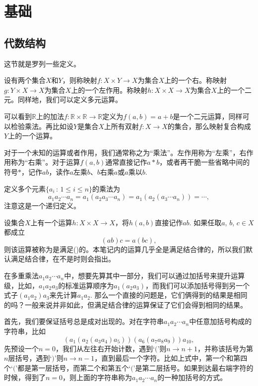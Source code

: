 \chapter{基础}

\section{代数结构}

这节就是罗列一些定义。

\begin{para}
设有两个集合$X$和$Y$，则称映射$f:X\times Y \to X$为集合$X$上的一个右。称映射$g:Y\times X \to X$为集合$X$上的一个左作用。称映射$h:X\times X \to X$为集合$X$上的一个二元。同样地，我们可以定义多元运算。
\end{para}

可以看到$\mathbb{R}$上的加法$f:\mathbb{R}\times \mathbb{R} \to \mathbb{R}$定义为$f(a,b)=a+b$是一个二元运算，同样可以检验乘法。再比如设$Y$是集合$X$上所有双射$f:X\to X$的集合，那么映射复合构成$Y$上的一个运算。

对于一个未知的运算或者作用，我们通常称之为“乘法”。左作用称为“左乘”，右作用称为“右乘”。对于运算$f(a,b)$通常直接记作$a*b$，或者再干脆一些省略中间的符号$*$，记作$ab$，读作$a$左乘$b$、$b$右乘$a$或$a$乘以$b$.

定义多个元素$\{a_i\,:\, 1\leq i \leq n\}$的乘法为
\[
	a_1a_2\cdots a_n=a_1(a_2a_3\cdots a_n)=a_1(a_2(a_3\cdots a_n))=\cdots,
\]
注意这是一个递归定义。

\begin{para}[结合律]
设集合$X$上有一个运算$h:X\times X \to X$，将$h(a,b)$直接记作$ab$. 如果任取$a$, $b$, $c\in X$都成立
\[
	(ab)c=a(bc),
\]
则该运算被称为是满足()的。本笔记内的运算几乎全是满足结合律的，所以我们默认满足结合律，在不是时则会指出。
\end{para}

在多重乘法$a_1a_2\cdots a_n$中，想要先算其中一部分，我们可以通过加括号来提升运算级，比如，$a_1a_2a_3$的标准运算顺序为$a_1(a_2a_3)$，而我们可以添加括号得到另一个式子$(a_1a_2)a_3$来先计算$a_1a_2$. 那么一个直接的问题是，它们俩得到的结果是相同的吗？一般来说并非如此，但满足结合律的运算保证了它们会得到相同的结果。

首先，我们要保证括号总是成对出现的。对在字符串$a_1a_2\cdots a_n$中任意加括号构成的字符串，比如
\[
(a_1(a_2(a_3a_4)a_5))(a_6(a_7a_8a_9))a_{10},
\]
先预设一个$n=0$，我们从左往右开始计数，遇到`$($'则$n\to n+1$，并称该括号为第$n$层括号，遇到`$)$'则$n\to n-1$，直到最后一个字符。比如上式中，第一个和第四个`$($'都是第一层括号，而第二个和第五个`$($'是第二层括号。如果到达最右端字符的时候，得到了$n=0$，则上面的字符串称为$a_1a_2\cdots a_n$的一种加括号的方式。

